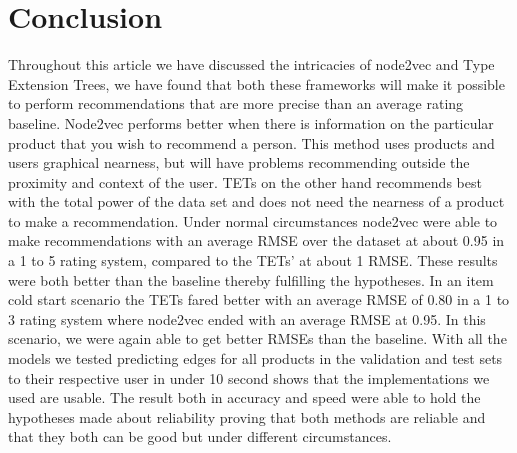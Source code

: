 \section{Conclusion}
Throughout this article we have discussed the intricacies of node2vec and Type Extension Trees, we have found that both these frameworks will make it possible to perform recommendations that are more precise than an average rating baseline.
Node2vec performs better when there is information on the particular product that you wish to recommend a person.
This method uses products and users graphical nearness, but will have problems recommending outside the proximity and context of the user.
TETs on the other hand recommends best with the total power of the data set and does not need the nearness of a product to make a recommendation.
Under normal circumstances node2vec were able to make recommendations with an average RMSE over the dataset at about 0.95 in a 1 to 5 rating system, compared to the TETs' at about 1 RMSE.
These results were both better than the baseline thereby fulfilling the hypotheses.
In an item cold start scenario the TETs fared better with an average RMSE of 0.80 in a 1 to 3 rating system where node2vec ended with an average RMSE at 0.95.
In this scenario, we were again able to get better RMSEs than the baseline.
With all the models we tested predicting edges for all products in the validation and test sets to their respective user in under 10 second shows that the implementations we used are usable.
The result both in accuracy and speed were able to hold the hypotheses made about reliability proving that both methods are reliable and that they both can be good but under different circumstances.
